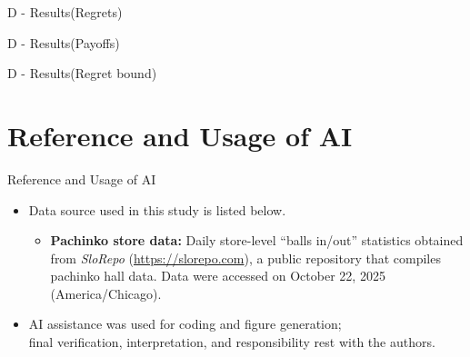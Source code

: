 \documentclass{beamer}
\begin{document}
\begin{frame}{D - Results(Regrets)}

    
\end{frame}

\begin{frame}{D - Results(Payoffs)}

    
\end{frame}

\begin{frame}{D - Results(Regret bound)}

    
\end{frame}

\section{Reference and Usage of AI}

\begin{frame}{Reference and Usage of AI}
\begin{itemize}
    \item Data source used in this study is listed below.
    \begin{itemize}
        \item \textbf{Pachinko store data:} Daily store-level ``balls in/out'' statistics obtained from \emph{SloRepo} (\url{https://slorepo.com}), a public repository that compiles pachinko hall data. Data were accessed on October 22, 2025 (America/Chicago). 
    \end{itemize}

    \item AI assistance was used for coding and figure generation;\\
    final verification, interpretation, and responsibility rest with the authors.
\end{itemize}
\end{frame}
\end{document}
